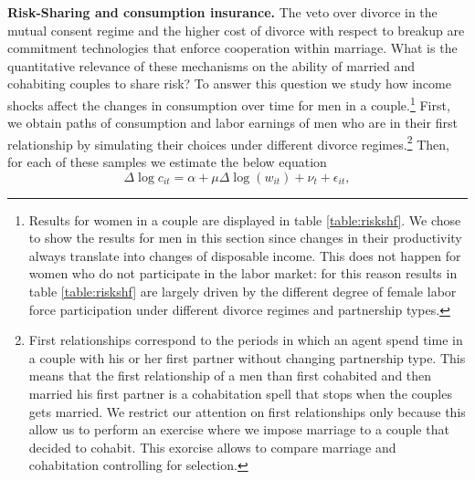\documentclass[12pt]{article}
\numberwithin{table}{section}
\begin{document}
\textbf{Risk-Sharing and consumption insurance.}
The veto over divorce in the mutual consent regime and the higher cost of divorce with respect to breakup are commitment technologies that enforce cooperation within marriage. What is the quantitative relevance of these mechanisms on the ability of married and cohabiting couples to share risk? To answer this question we study how income shocks affect the changes in consumption over time for men in a couple.\footnote{Results for women in a couple are displayed in table \ref{table:riskshf}. We chose to show the results for men in this section since changes in their productivity always translate into changes of disposable income. This does not happen for women who do not participate in the labor market: for this reason results in table \ref{table:riskshf} are largely driven by the different degree of female labor force participation under different divorce regimes and partnership types.} First, we obtain paths of consumption and labor earnings of men who are in their first relationship by simulating their choices under different divorce regimes.\footnote{First relationships correspond to the periods in which an agent spend time in a couple with his or her first partner without changing partnership type. This means that the first relationship of a men than first cohabited and then married his first partner is a cohabitation spell that stops when the couples gets married. We restrict our attention on first relationships only because this allow us to perform an exercise where we impose marriage to a couple that decided to cohabit. This exorcise allows to compare marriage and cohabitation controlling for selection.} Then, for each of these samples we estimate the below equation
\[\Delta \log c_{it}=\alpha+\mu \Delta \log(w_{it})+\nu_{t}+\epsilon_{it},\]
\end{document}
